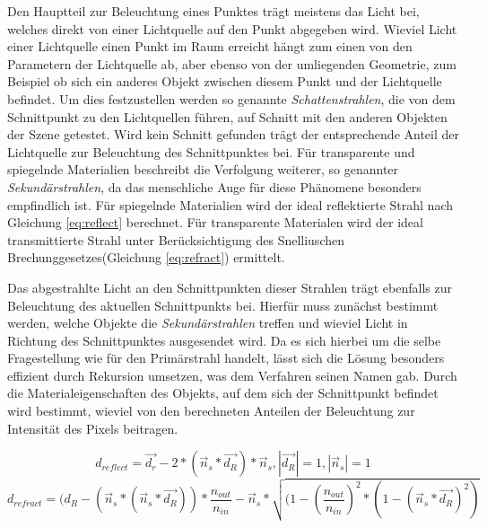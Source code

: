 Den Hauptteil zur Beleuchtung eines Punktes trägt meistens das Licht bei, welches direkt von einer Lichtquelle auf den Punkt abgegeben wird. Wieviel Licht einer Lichtquelle einen Punkt im Raum erreicht hängt zum einen von den Parametern der Lichtquelle ab, aber ebenso von der umliegenden Geometrie, zum Beispiel ob sich ein anderes Objekt zwischen diesem Punkt und der Lichtquelle befindet. Um dies festzustellen werden so genannte \textit{Schattenstrahlen}, die von dem Schnittpunkt zu den Lichtquellen führen, auf Schnitt mit den anderen Objekten der Szene getestet. Wird kein Schnitt gefunden trägt der entsprechende Anteil der Lichtquelle zur Beleuchtung des Schnittpunktes bei.
Für transparente und spiegelnde Materialien beschreibt \cite{Whitted80} die Verfolgung weiterer, so genannter \textit{Sekundärstrahlen}, da das menschliche Auge für diese Phänomene besonders empfindlich ist. Für spiegelnde Materialien wird der ideal reflektierte Strahl nach Gleichung \ref{eq:reflect} berechnet. Für transparente Materialen wird der ideal transmittierte Strahl unter Berücksichtigung des Snelliuschen Brechunggesetzes(Gleichung \ref{eq:refract}) ermittelt. 

Das abgestrahlte Licht an den Schnittpunkten dieser Strahlen trägt ebenfalls zur Beleuchtung des aktuellen Schnittpunkts bei.
Hierfür muss zunächst bestimmt werden, welche Objekte die  \textit{Sekundärstrahlen} treffen und wieviel Licht in Richtung des Schnittpunktes ausgesendet wird. Da es sich hierbei um die selbe Fragestellung wie für den Primärstrahl handelt, lässt sich die Lösung besonders effizient durch Rekursion umsetzen, was dem Verfahren seinen Namen gab.
Durch die Materialeigenschaften des Objekts, auf dem sich der Schnittpunkt befindet wird bestimmt, wieviel von den berechneten Anteilen der Beleuchtung zur Intensität des Pixels beitragen.

\begin{equation}
\label{eq:reflect}
d_{reflect} = \vec{d_r} - 2 * ( \vec{n}_{s} * \vec{d_R} ) * \vec{n}_{s}, |\vec{d_R}| = 1, |\vec{n}_{s}| = 1
\end{equation}
\begin{equation} 
\label{eq:refract}
d_{refract} = ( d_R - ( \vec{n}_{s} * ( \vec{n}_{s} * \vec{d_R} )  ) * \frac{n_{out}}{n_{in}}  - \vec{n}_{s} * \sqrt{( 1 - (\frac{n_{out}}{n_{in}} )^2  * ( 1 - ( \vec{n}_{s} * \vec{d_R} )^2 )}
\end{equation}


